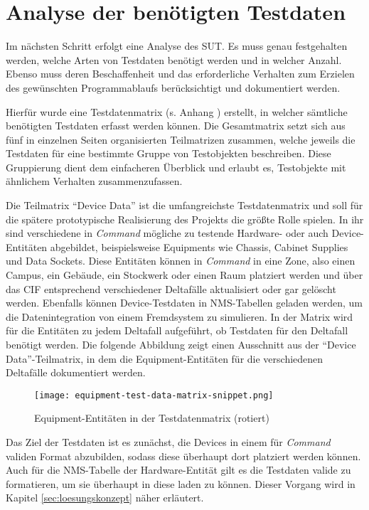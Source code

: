 \section{Analyse der benötigten Testdaten}\label{sec:testdatenanalyse}
Im nächsten Schritt erfolgt eine Analyse des \acf{SUT}. Es muss genau festgehalten werden, welche Arten von Testdaten benötigt werden und in welcher Anzahl. Ebenso muss deren Beschaffenheit und das erforderliche Verhalten zum Erzielen des gewünschten Programmablaufs berücksichtigt und dokumentiert werden. 

Hierfür wurde eine Testdatenmatrix (s. Anhang ) erstellt, in welcher sämtliche benötigten Testdaten erfasst werden können. Die Gesamtmatrix setzt sich aus fünf in einzelnen Seiten organisierten Teilmatrizen zusammen, welche jeweils die Testdaten für eine bestimmte Gruppe von Testobjekten beschreiben. Diese Gruppierung dient dem einfacheren Überblick und erlaubt es, Testobjekte mit ähnlichem Verhalten zusammenzufassen.

Die Teilmatrix \enquote{Device Data} ist die umfangreichste Testdatenmatrix und soll für die spätere prototypische Realisierung des Projekts die größte Rolle spielen. In ihr sind verschiedene in \textit{Command} mögliche zu testende Hardware- oder auch Device-Entitäten abgebildet, beispielsweise Equipments wie Chassis, Cabinet Supplies und Data Sockets. Diese Entitäten können in \textit{Command} in eine Zone, also einen Campus, ein Gebäude, ein Stockwerk oder einen Raum platziert werden und über das \ac{CIF} entsprechend verschiedener Deltafälle aktualisiert oder gar gelöscht werden. Ebenfalls können Device-Testdaten in \ac{NMS}-Tabellen geladen werden, um die Datenintegration von einem Fremdsystem zu simulieren. In der Matrix wird für die Entitäten zu jedem Deltafall aufgeführt, ob Testdaten für den Deltafall benötigt werden. Die folgende Abbildung zeigt einen Ausschnitt aus der \enquote{Device Data}-Teilmatrix, in dem die Equipment-Entitäten für die verschiedenen Deltafälle dokumentiert werden.

\begin{figure}[h]
    \centering
    \texttt{[image: equipment-test-data-matrix-snippet.png]}
    \caption[Equipment-Entitäten in der Testdatenmatrix]{Equipment-Entitäten in der Testdatenmatrix (rotiert)}
\end{figure}

\newpage
Das Ziel der Testdaten ist es zunächst, die Devices in einem für \textit{Command} validen Format abzubilden, sodass diese überhaupt dort platziert werden können. Auch für die \ac{NMS}-Tabelle der Hardware-Entität gilt es die Testdaten valide zu formatieren, um sie überhaupt in diese laden zu können. Dieser Vorgang wird in Kapitel \ref{sec:loesungskonzept} näher erläutert. 

